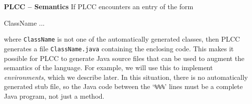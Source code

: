 \begin{minipage}[t]{\sw}
\slidenumber
\LARGE
{\bf PLCC -- Semantics}\exx
If PLCC encounters an entry of the form
\begin{qv}
ClassName
...
\end{qv}
where \verb'ClassName' is not one
of the automatically generated classes,
then PLCC generates a file \verb'ClassName.java'
containing the enclosing code.
This makes it possible for PLCC to generate Java source files
that can be used to augment the semantics of the language.
For example, we will use this to implement {\em environments},
which we describe later.\exx
In this situation, there is no automatically generated stub file,
so the Java code between the `\verb'%%%'' lines
must be a complete Java program, not just a method.
\end{minipage}
\clearpage

